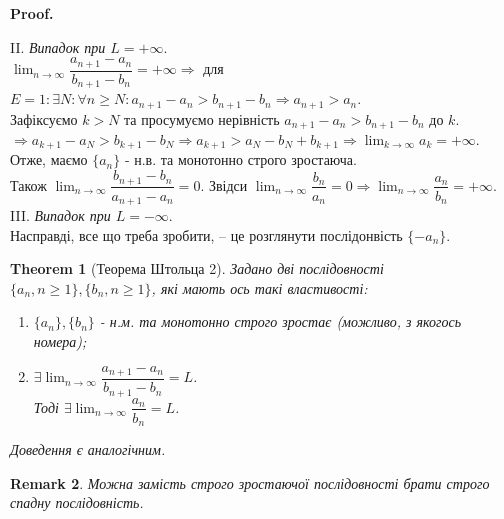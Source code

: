 \documentclass[a4paper, 14pt]{article}
\makeatletter
\def\qed{$\blacksquare$}
\theoremstyle{theoremdd}
\newtheorem{theorem}{Theorem}[subsection]
\theoremstyle{theoremdd}
\theoremstyle{theoremdd}
\theoremstyle{theoremdd}
\theoremstyle{theoremdd}
\theoremstyle{theoremdd}
\newtheorem{remark}[theorem]{Remark}
\theoremstyle{theoremdd}
\theoremstyle{theoremdd}
\renewenvironment{proof}[1][Proof.\\]{\par
\pushQED{\hfill \qed}%
\normalfont \topsep6\p@\@plus6\p@\relax
\trivlist
\item\relax
{\bfseries
#1\@addpunct{.}}\hspace\labelsep\ignorespaces
}{%
\popQED\endtrivlist\@endpefalse
}
\makeatother
\begin{document}
\begin{proof}
	II. \textit{Випадок при $L = +\infty$}. \\
	$\displaystyle \lim_{n \to \infty} \dfrac{a_{n+1} - a_n}{b_{n+1} - b_n} = + \infty \Rightarrow$ для $E = 1: \exists N: \forall n \geq N: a_{n+1} - a_n > b_{n+1} - b_n \Rightarrow a_{n+1} > a_n$.\\
	Зафіксуємо $k > N$ та просумуємо нерівність $a_{n+1} - a_n > b_{n+1} - b_n$ до $k$.\\
	$\Rightarrow a_{k+1} - a_N > b_{k+1} - b_N \Rightarrow a_{k+1} > a_N-b_N + b_{k+1} \Rightarrow \displaystyle\lim_{k \to \infty} a_k = +\infty$.\\
	Отже, маємо $\{a_n\}$ - н.в. та монотонно строго зростаюча.\\
	Також $\displaystyle \lim_{n \to \infty} \dfrac{b_{n+1} - b_n}{a_{n+1} - a_n} = 0$.
	Звідси $\displaystyle \lim_{n \to \infty} \dfrac{b_n}{a_n} = 0 \Rightarrow \lim_{n \to \infty} \dfrac{a_n}{b_n} = + \infty$.
	\bigskip \\
	III. \textit{Випадок при $L = -\infty$}.\\
	Насправді, все що треба зробити, -- це розглянути послідонвість $\{-a_n\}$.
	\end{proof}
	
	\begin{theorem}[Теорема Штольца 2]
	Задано дві послідовності $\{a_n, n \geq 1\}, \{b_n, n \geq 1\}$, які мають ось такі властивості:
	\begin{enumerate}[nosep,wide=0pt,label={\arabic*)}]
	\item $\{a_n\}, \{b_n\}$ - н.м. та монотонно строго зростає (можливо, з якогось номера);
	\item $\exists \displaystyle \lim_{n \to \infty} \dfrac{a_{n+1} - a_n}{b_{n+1} - b_n} = L$.\\
	Тоді $\exists \displaystyle \lim_{n \to \infty} \dfrac{a_n}{b_n} = L$.
	\end{enumerate}
	\textit{Доведення є аналогічним.}
	\end{theorem}
	
	\begin{remark}
	Можна замість строго зростаючої послідовності брати строго спадну послідовність.
	\end{remark}
	
\end{document}
